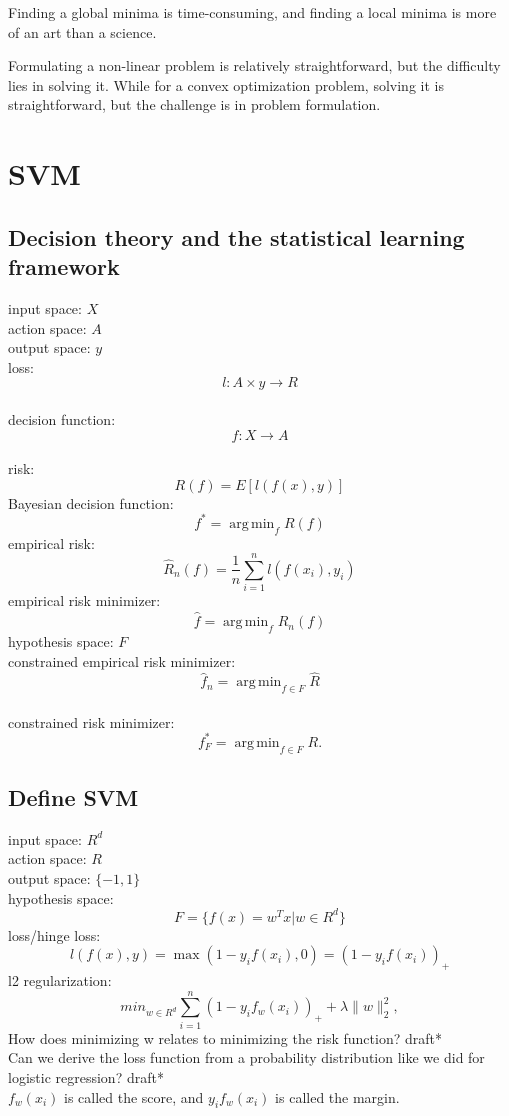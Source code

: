 \documentclass{report}
\DeclareMathOperator*{\argmin}{arg\,min}
\begin{document}
Finding a global minima is time-consuming, and finding a local minima is more of an art than a science.

Formulating a non-linear problem is relatively straightforward, but the difficulty lies in solving it. While for a convex optimization problem, solving it is straightforward, but the challenge is in problem formulation. 
\chapter{SVM}
\section{Decision theory and the statistical learning framework}
{\noindent input space: $X$}\\
action space: $A$\\
output space: $y$\\
loss: \[ l: A \times y \to R\]\\
decision function: \[ f: X \to A\] \\
risk: \[R(f) = E[l(f(x), y)] \]
Bayesian decision function: \[ f^{\ast} = \argmin_{f} R(f) \]
empirical risk: \[
\hat{R}_n(f) = \frac{1}{n} \sum_{i=1}^{n} l(f(x_i), y_i)\]
empirical risk minimizer: \[
	\hat{f} = \argmin_{f} \hat{R}_n(f)
\] 
hypothesis space: $F$ \\
constrained empirical risk minimizer: \[
	\hat{f}_{n} = \argmin_{f \in F} \hat{R}
\] \\
constrained risk minimizer: \[
	f^{\ast}_{F} = \argmin_{f \in F} R
.\] 

\section{Define SVM}

{\noindent input space: $R^d$} \\
action space: $R$ \\
output space: $\{-1, 1\}$\\
hypothesis space: \[ F = \{ f(x) = w^T x | w \in R^d\}\]
loss/hinge loss: \[ l\left( f(x), y \right) = \max(1 - y_if(x_i), 0) = \left( 1 - y_if(x_i) \right)_+ \]
l2 regularization: \[
	min_{w \in R^d}\sum_{i=1}^{n} \left( 1 -y_if_w(x_i) \right)_+ + \lambda\|w\|_2^2 
,\] 
How does minimizing w relates to minimizing the risk function? draft*\\
Can we derive the loss function from a probability distribution like we did for logistic regression? draft*\\
$f_w(x_i)$ is called the score, and $y_if_w(x_i)$ is called the margin.
\end{document}
